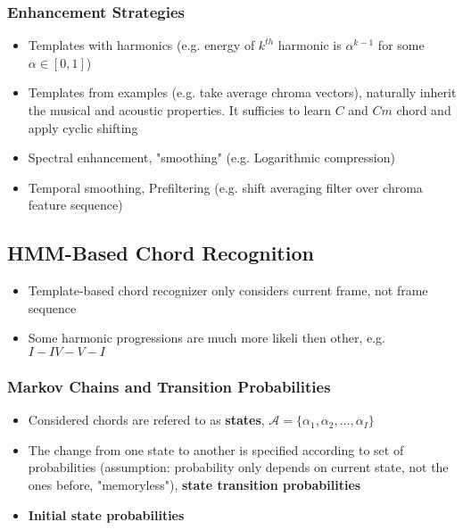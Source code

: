 \documentclass{scrartcl}
\begin{document}
\subsubsection*{Enhancement Strategies}
\begin{itemize}
    \item
        Templates with harmonics (e.g. energy of $k^{th}$ harmonic is $\alpha^{k-1}$ for some $\alpha \in [0,1]$)
    \item
        Templates from examples (e.g. take average chroma vectors), naturally inherit the musical and acoustic properties. It sufficies to learn $C$ and $Cm$ chord and apply cyclic shifting
    \item
        Spectral enhancement, "smoothing" (e.g. Logarithmic compression)
    \item
        Temporal smoothing, Prefiltering (e.g. shift averaging filter over chroma feature sequence)
\end{itemize}
\subsection*{HMM-Based Chord Recognition}
\begin{itemize}
    \item
        Template-based chord recognizer only considers current frame, not frame sequence
    \item
        Some harmonic progressions are much more likeli then other, e.g. $I-IV-V-I$
\end{itemize}
\subsubsection*{Markov Chains and Transition Probabilities}
\begin{itemize}
    \item
        Considered chords are refered to as \textbf{states}, $\mathcal{A} = \{\alpha_1, \alpha_2, \dots, \alpha_I\}$
    \item
        The change from one state to another is specified according to set of probabilities (assumption: probability only depends on current state, not the ones before, "memoryless"), \textbf{state transition probabilities}
    \item 
        \textbf{Initial state probabilities}
\end{itemize}
\end{document}
